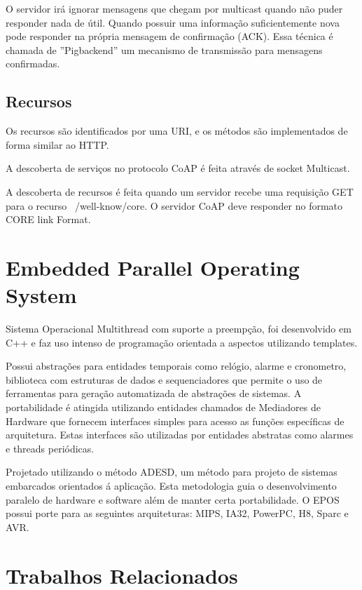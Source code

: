  O servidor ir\'a ignorar mensagens que chegam por multicast quando n\~ao puder responder nada de \'util. Quando possuir uma informa\c{c}\~ao suficientemente nova pode responder na pr\'opria mensagem de confirma\c{c}\~ao (ACK). Essa t\'ecnica \'e chamada de ''Pigbackend'' um mecanismo de transmiss\~ao para mensagens confirmadas.\cite{draft-ietf-core-coap-18}

 \subsection{Recursos}
Os recursos s\~ao identificados por uma URI, e os m\'etodos s\~ao implementados de forma similar ao HTTP.

A descoberta de servi\c{c}os no protocolo CoAP \'e feita atrav\'es de socket Multicast.

A descoberta de recursos \'e feita quando um servidor recebe uma requisi\c{c}\~ao GET para o recurso ~/well-know/core. O servidor CoAP deve responder no formato CORE link Format.\cite{rfc6690}

\section{Embedded Parallel Operating System}
Sistema Operacional Multithread com suporte a preemp\c{c}\~ao, foi desenvolvido em C++ e faz uso intenso de programa\c{c}\~ao orientada a aspectos utilizando templates.

Possui abstra\c{c}\~oes para entidades temporais como rel\'ogio, alarme e cronometro, biblioteca com estruturas de dados e sequenciadores que permite o uso de ferramentas para gera\c{c}\~ao automatizada de abstra\c{c}\~oes de sistemas. A portabilidade \'e atingida utilizando entidades chamados de Mediadores de Hardware que fornecem interfaces simples para acesso as fun\c{c}\~oes espec\'ificas de arquitetura. Estas interfaces s\~ao utilizadas por entidades abstratas como alarmes e threads peri\'odicas.

Projetado utilizando o m\'etodo ADESD, um m\'etodo para projeto de sistemas embarcados orientados \'a aplica\c{c}\~ao. Esta metodologia guia o desenvolvimento paralelo de hardware e software al\'em de manter certa portabilidade. O EPOS possui porte para as seguintes arquiteturas: MIPS, IA32, PowerPC, H8, Sparc e AVR.

\cite{epos}

\section{Trabalhos Relacionados}

